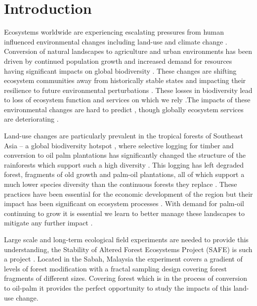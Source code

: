 
\section{Introduction}

Ecosystems worldwide are experiencing escalating pressures from human influenced environmental changes including land-use and climate change \citep{Hautier2015}. Conversion of natural landscapes to agriculture and urban environments has been driven by continued population growth and increased demand for resources \citep{Green2005, Foley2005} having significant impacts on global biodiversity \citep{Pimm1995}. These changes are shifting ecosystem communities away from historically stable states \citep{Hautier2015} and impacting their resilience to future environmental perturbations \citep{Oliver2015}. These losses in biodiversity lead to loss of ecosystem function and services on which we rely \citep{Diaz2006, MillenniumEcosystemAssessment2005}.The impacts of these environmental changes are hard to predict \citep{Carpenter2009}, though globally ecosystem services are deteriorating \citep{Mace2012}.

Land-use changes are particularly prevalent in the tropical forests of Southeast Asia – a global biodiversity hotspot \citep{DeBruyn2014},  where selective logging for timber and conversion to oil palm plantations has significantly changed the structure of the rainforests which support such a high diversity \citep{Gibson2011}. This logging has left degraded forest, fragments of old growth and palm-oil plantations, all of which support a much lower species diversity than the continuous forests they replace \citep{Fitzherbert2008, Haddad2015} . These practices have been essential for the economic development of the region \citep{Basiron2007} but their impact has been significant on ecosystem processes \citep{Koh2011, Schleuning2011, Ewers2015}.  With demand for palm-oil continuing to grow it is essential we learn to better manage these landscapes to mitigate any further impact \citep{Turner2008}.

Large scale and long-term ecological field experiments are needed to provide this understanding, the Stability of Altered Forest Ecosystems Project (SAFE) is such a project \citep{Ewers2011a}. Located in the Sabah, Malaysia the experiment covers a gradient of levels of forest modification with a fractal sampling design covering forest fragments of different sizes. Covering forest which is in the process of conversion to oil-palm it provides the perfect opportunity to study the impacts of this land-use change.

